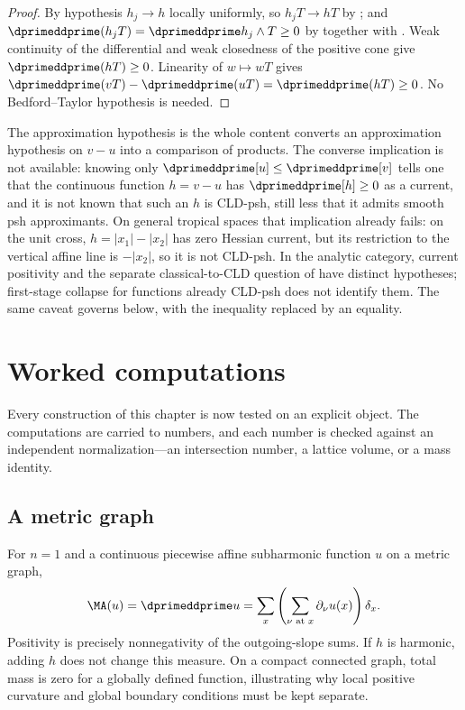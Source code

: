 \begin{proof}
By hypothesis $h_j\to h$ locally uniformly, so $h_jT\to hT$ by
; and
$\dprimeddprime(h_jT)=\dprimeddprime h_j\wedge T\geq0$ by
 together with
.  Weak continuity of the
differential and weak closedness of the positive cone give
$\dprimeddprime(hT)\geq0$.  Linearity of $w\mapsto wT$ gives
$\dprimeddprime(vT)-\dprimeddprime(uT)=\dprimeddprime(hT)\geq0$.  No
Bedford--Taylor hypothesis is needed.
\end{proof}

\begin{warning}{The approximation hypothesis is the whole content}
 converts an approximation hypothesis on
$v-u$ into a comparison of products.  The converse implication is not
available: knowing only $\dprimeddprime[u]\leq\dprimeddprime[v]$ tells one
that the continuous function $h=v-u$ has $\dprimeddprime[h]\geq0$ as a
current, and it is not known that such an $h$ is CLD-psh, still less that it
admits smooth psh approximants.  On general tropical spaces that implication already fails: on the
unit cross, $h=|x_1|-|x_2|$ has zero Hessian current, but its restriction
to the vertical affine line is $-|x_2|$, so it is not CLD-psh.  In the
analytic category, current positivity and the separate classical-to-CLD
question of  have distinct hypotheses;
first-stage collapse for functions already CLD-psh does not identify them.  The same
caveat governs  below, with the
inequality replaced by an equality.
\end{warning}

\section{Worked computations}
\label{sec:ch16-worked}

Every construction of this chapter is now tested on an explicit object.  The
computations are carried to numbers, and each number is checked against an
independent normalization---an intersection number, a lattice volume, or a
mass identity.

\subsection{A metric graph}
\label{sec:ch16-worked-graph}

\begin{example}
\label{ex:ch16-metric-graph}
For $n=1$ and a continuous piecewise affine subharmonic function $u$ on a
metric graph,
\[
                   \MA(u)=\dprimeddprime u
                    =\sum_x\left(\sum_{\nu\text{ at }x}
                         \partial_\nu u(x)\right)\delta_x.
\]
Positivity is precisely nonnegativity of the outgoing-slope sums.  If $h$ is
harmonic, adding $h$ does not change this measure.  On a compact connected
graph, total mass is zero for a globally defined function, illustrating why
local positive curvature and global boundary conditions must be kept
separate.
\end{example}

